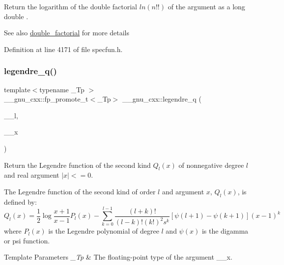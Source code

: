 Return the logarithm of the double factorial $ ln(n!!) $ of the argument as a {\ttfamily  long double }.

\begin{DoxySeeAlso}{See also}
\hyperlink{group__gnu__math__spec__func_ga1e62c47f84f9782828f8830b4fedc13c}{double\+\_\+factorial} for more details 
\end{DoxySeeAlso}


Definition at line 4171 of file specfun.\+h.

\mbox{\label{group__gnu__math__spec__func_gadad5b22d0075dca31690907668af568f}} 
\subsubsection{\texorpdfstring{legendre\+\_\+q()}{legendre\_q()}}
{\footnotesize\ttfamily template$<$typename \+\_\+\+Tp $>$ \\
\+\_\+\+\_\+gnu\+\_\+cxx\+::fp\+\_\+promote\+\_\+t$<$\+\_\+\+Tp$>$ \+\_\+\+\_\+gnu\+\_\+cxx\+::legendre\+\_\+q (\begin{DoxyParamCaption}\item[{unsigned int}]{\+\_\+\+\_\+l,  }\item[{\+\_\+\+Tp}]{\+\_\+\+\_\+x }\end{DoxyParamCaption})\hspace{0.3cm}{\ttfamily [inline]}}

Return the Legendre function of the second kind $ Q_l(x) $ of nonnegative degree $ l $ and real argument $ |x| <= 0 $.

The Legendre function of the second kind of order $ l $ and argument $ x $, $ Q_l(x) $, is defined by\+: \[ Q_l(x) = \frac{1}{2} \log{\frac{x+1}{x-1}} P_l(x) - \sum_{k=0}^{l-1}\frac{(l+k)!}{(l-k)!(k!)^2s^k} \left[\psi(l+1) - \psi(k+1)\right](x-1)^k \] where $ P_l(x) $ is the Legendre polynomial of degree $ l $ and $ \psi(x) $ is the digamma or psi function.


\begin{DoxyTemplParams}{Template Parameters}
{\em \+\_\+\+Tp} & The floating-\/point type of the argument {\ttfamily \+\_\+\+\_\+x}. \\
\hline
\end{DoxyTemplParams}

